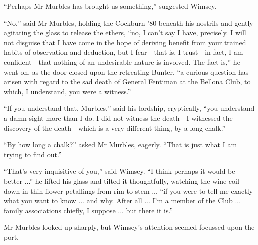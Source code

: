 \enquote{Perhaps Mr Murbles has brought us something,} suggested Wimsey.

\enquote{No,} said Mr Murbles, holding the Cockburn '80 beneath his nostrils and gently agitating the glass to release the ethers, \enquote{no, I can't say I have, precisely. I will not disguise that I have come in the hope of deriving benefit from your trained habits of observation and deduction, but I fear\allowbreak---\allowbreak that is, I trust\allowbreak---\allowbreak in fact, I am confident\allowbreak---\allowbreak that nothing of an undesirable nature is involved. The fact is,} he went on, as the door closed upon the retreating Bunter, \enquote{a curious question has arisen with regard to the sad death of General Fentiman at the Bellona Club, to which, I understand, you were a witness.}

\enquote{If you understand that, Murbles,} said his lordship, cryptically, \enquote{you understand a damn sight more than I do. I did not witness the death\allowbreak---\allowbreak I witnessed the discovery of the death\allowbreak---\allowbreak which is a very different thing, by a long chalk.}

\enquote{By how long a chalk?} asked Mr Murbles, eagerly. \enquote{That is just what I am trying to find out.}

\enquote{That's very inquisitive of you,} said Wimsey. \enquote{I think perhaps it would be better ...} he lifted his glass and tilted it thoughtfully, watching the wine coil down in thin flower-petallings from rim to stem ... \enquote{if you were to tell me exactly what you want to know ... and why. After all ... I'm a member of the Club ... family associations chiefly, I suppose ... but there it is.}

Mr Murbles looked up sharply, but Wimsey's attention seemed focussed upon the port.

